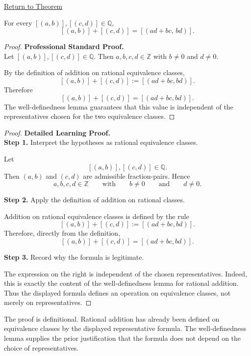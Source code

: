 \newpage
{}
\label{prf:ec-addition}

\begin{remark*}[Return]
\hyperref[thm:ec-addition]{Return to Theorem}
\end{remark*}

\begin{theorem*}
For every $[(a,b)],[(c,d)]\in\mathbb{Q}$,
\[
[(a,b)] + [(c,d)] = [(ad+bc,\,bd)].
\]
\end{theorem*}

\begin{proof}
\textbf{Professional Standard Proof.}~\\
Let $[(a,b)],[(c,d)]\in\mathbb{Q}$. Then $a,b,c,d\in\mathbb{Z}$ with
$b\neq 0$ and $d\neq 0$.

By the definition of addition on rational equivalence classes,
\[
[(a,b)] + [(c,d)]
:=
[(ad+bc,bd)].
\]
Therefore
\[
[(a,b)] + [(c,d)] = [(ad+bc,bd)].
\]
The well-definedness lemma guarantees that this value is independent of
the representatives chosen for the two equivalence classes.
\end{proof}

\begin{proof}
\textbf{Detailed Learning Proof.}~\\

\textbf{Step 1.} Interpret the hypotheses as rational equivalence classes.

Let
\[
[(a,b)],[(c,d)]\in\mathbb{Q}.
\]
Then $(a,b)$ and $(c,d)$ are admissible fraction-pairs. Hence
\[
a,b,c,d\in\mathbb{Z}
\qquad\text{with}\qquad
b\neq 0
\qquad\text{and}\qquad
d\neq 0.
\]

\textbf{Step 2.} Apply the definition of addition on rational classes.

Addition on rational equivalence classes is defined by the rule
\[
[(a,b)] + [(c,d)]
:=
[(ad+bc,bd)].
\]
Therefore, directly from the definition,
\[
[(a,b)] + [(c,d)] = [(ad+bc,bd)].
\]

\textbf{Step 3.} Record why the formula is legitimate.

The expression on the right is independent of the chosen representatives.
Indeed, this is exactly the content of the well-definedness lemma for
rational addition. Thus the displayed formula defines an operation on
equivalence classes, not merely on representatives.
\end{proof}

\begin{remark*}
The proof is definitional. Rational addition has already been defined on
equivalence classes by the displayed representative formula. The
well-definedness lemma supplies the prior justification that the formula
does not depend on the choice of representatives.
\end{remark*}

